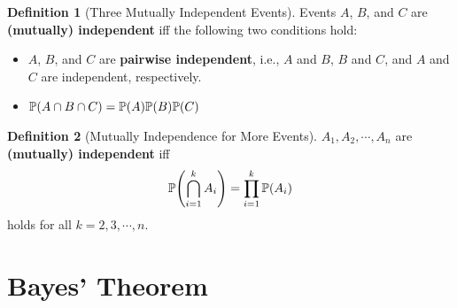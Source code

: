 \documentclass[10pt,UTF8]{article}
\newenvironment{definition box}
{\begin{tcolorbox}[colback=blue!5!white,colframe=blue!75!black,parbox=false,before upper=\par,before lower=\par]}
{\end{tcolorbox}}
\newenvironment{theorem box}
{\begin{tcolorbox}[colback=yellow!5!white,colframe=yellow!75!black,parbox=false,before upper=\par,before lower=\par]}
{\end{tcolorbox}}
\theoremstyle{definition}
\newtheorem{definition inner}{Definition}[section]
\newenvironment{definition}[1][]
{\begin{definition box}\begin{definition inner}[#1]\hfill\par}
{\end{definition inner}\end{definition box}}
\theoremstyle{plain}
\newtheorem{theorem inner}{Theorem}[section]
\theoremstyle{definition}
\newtheorem*{proof inner}{\textit{Proof}}
\theoremstyle{remark}
\newcommand{\Prob}{\mathbb{P}\qty}
\begin{document}
\begin{definition}[Three Mutually Independent Events]
    Events $A$, $B$, and $C$ are \textbf{(mutually) independent}
    iff the following two conditions hold:
    \begin{itemize}
        \item $A$, $B$, and $C$ are \textbf{pairwise independent}, i.e.,
        $A$ and $B$, $B$ and $C$, and $A$ and $C$ are independent, respectively.
        \item $\Prob(A\cap B\cap C) = \Prob(A)\Prob(B)\Prob(C)$
    \end{itemize}
\end{definition}

\begin{definition}[Mutually Independence for More Events]
    $A_1, A_2, \cdots, A_n$ are \textbf{(mutually) independent} iff
    \begin{equation*}
        \Prob(\bigcap_{i=1}^k A_i) = \prod_{i=1}^k \Prob(A_i)
    \end{equation*}
    holds for all $k=2,3,\cdots,n$.
\end{definition}

\section{Bayes' Theorem}
\end{document}
